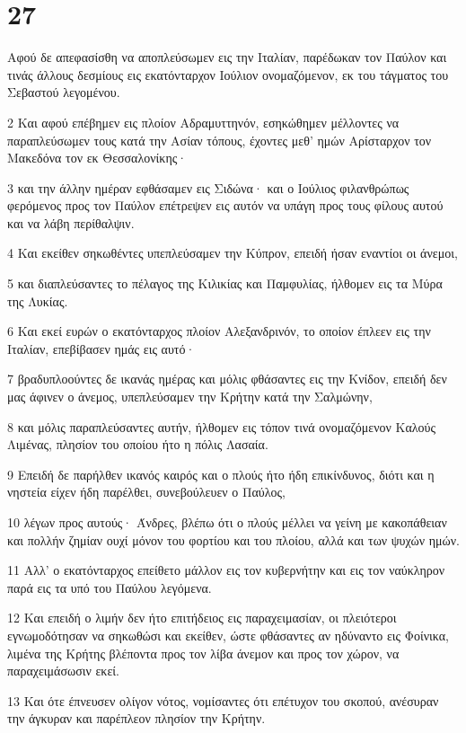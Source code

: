 \chapter{27}

\par Αφού δε απεφασίσθη να αποπλεύσωμεν εις την Ιταλίαν, παρέδωκαν τον Παύλον και τινάς άλλους δεσμίους εις εκατόνταρχον Ιούλιον ονομαζόμενον, εκ του τάγματος του Σεβαστού λεγομένου.
\par 2 Και αφού επέβημεν εις πλοίον Αδραμυττηνόν, εσηκώθημεν μέλλοντες να παραπλεύσωμεν τους κατά την Ασίαν τόπους, έχοντες μεθ' ημών Αρίσταρχον τον Μακεδόνα τον εκ Θεσσαλονίκης·
\par 3 και την άλλην ημέραν εφθάσαμεν εις Σιδώνα· και ο Ιούλιος φιλανθρώπως φερόμενος προς τον Παύλον επέτρεψεν εις αυτόν να υπάγη προς τους φίλους αυτού και να λάβη περίθαλψιν.
\par 4 Και εκείθεν σηκωθέντες υπεπλεύσαμεν την Κύπρον, επειδή ήσαν εναντίοι οι άνεμοι,
\par 5 και διαπλεύσαντες το πέλαγος της Κιλικίας και Παμφυλίας, ήλθομεν εις τα Μύρα της Λυκίας.
\par 6 Και εκεί ευρών ο εκατόνταρχος πλοίον Αλεξανδρινόν, το οποίον έπλεεν εις την Ιταλίαν, επεβίβασεν ημάς εις αυτό·
\par 7 βραδυπλοούντες δε ικανάς ημέρας και μόλις φθάσαντες εις την Κνίδον, επειδή δεν μας άφινεν ο άνεμος, υπεπλεύσαμεν την Κρήτην κατά την Σαλμώνην,
\par 8 και μόλις παραπλεύσαντες αυτήν, ήλθομεν εις τόπον τινά ονομαζόμενον Καλούς Λιμένας, πλησίον του οποίου ήτο η πόλις Λασαία.
\par 9 Επειδή δε παρήλθεν ικανός καιρός και ο πλούς ήτο ήδη επικίνδυνος, διότι και η νηστεία είχεν ήδη παρέλθει, συνεβούλευεν ο Παύλος,
\par 10 λέγων προς αυτούς· Άνδρες, βλέπω ότι ο πλούς μέλλει να γείνη με κακοπάθειαν και πολλήν ζημίαν ουχί μόνον του φορτίου και του πλοίου, αλλά και των ψυχών ημών.
\par 11 Αλλ' ο εκατόνταρχος επείθετο μάλλον εις τον κυβερνήτην και εις τον ναύκληρον παρά εις τα υπό του Παύλου λεγόμενα.
\par 12 Και επειδή ο λιμήν δεν ήτο επιτήδειος εις παραχειμασίαν, οι πλειότεροι εγνωμοδότησαν να σηκωθώσι και εκείθεν, ώστε φθάσαντες αν ηδύναντο εις Φοίνικα, λιμένα της Κρήτης βλέποντα προς τον λίβα άνεμον και προς τον χώρον, να παραχειμάσωσιν εκεί.
\par 13 Και ότε έπνευσεν ολίγον νότος, νομίσαντες ότι επέτυχον του σκοπού, ανέσυραν την άγκυραν και παρέπλεον πλησίον την Κρήτην.
